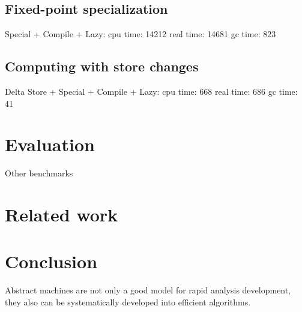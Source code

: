 \documentclass{llncs}
\begin{document}
\subsection{Fixed-point specialization}


Special + Compile + Lazy:
   cpu time: 14212 real time: 14681 gc time: 823

\subsection{Computing with store changes}

Delta Store + Special + Compile + Lazy:
   cpu time: 668 real time: 686 gc time: 41

\section{Evaluation}

Other benchmarks

\section{Related work}

\section{Conclusion}

Abstract machines are not only a good model for rapid analysis
development, they also can be systematically developed into efficient
algorithms.
\end{document}
